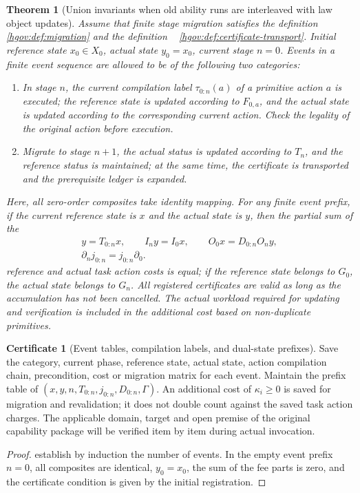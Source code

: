 \documentclass[12pt,a4paper,openany,notitlepage]{report}
\theoremstyle{plain}
\newtheorem{theorem}{Theorem}[chapter]
\theoremstyle{definition}
\newtheorem*{certificate}{Certificate}
\theoremstyle{remark}
\begin{document}
\begin{CJK*}
\begin{theorem}
[Union invariants when old ability runs are interleaved with law object updates]\label{exp:gov:interleaved-governance}
Assume that finite stage migration satisfies the definition ~ \ref{hgov:def:migration} and the definition ~ \ref{hgov:def:certificate-transport}. Initial reference state $x_0\in X_0$, actual state $y_0=x_0$, current stage $n=0$. Events in a finite event sequence are allowed to be of the following two categories:\begin{enumerate}
[label=(\roman*)]\item
In stage $n$, the current compilation label $\tau_{0:n}(a)$ of a primitive action $a$ is executed; the reference state is updated according to $F_{0,a}$, and the actual state is updated according to the corresponding current action. Check the legality of the original action before execution.\item
Migrate to stage $n+1$, the actual status is updated according to $T_n$, and the reference status is maintained; at the same time, the certificate is transported and the prerequisite ledger is expanded.\end{enumerate}
Here, all zero-order composites take identity mapping. For any finite event prefix, if the current reference state is $x$ and the actual state is $y$, then the partial sum of the \[
\begin{gathered}
 y=T_{0:n}x,\qquad I_ny=I_0x,\qquad
 O_0x=D_{0:n}O_ny,\\
 \partial_nj_{0:n}=j_{0:n}\partial_0.
\end{gathered}
\] reference and actual task action costs is equal; if the reference state belongs to $G_0$, the actual state belongs to $G_n$. All registered certificates are valid as long as the accumulation has not been cancelled. The actual workload required for updating and verification is included in the additional cost based on non-duplicate primitives.\end{theorem}
\begin{certificate}
[Event tables, compilation labels, and dual-state prefixes]Save the category, current phase, reference state, actual state, action compilation chain, precondition, cost or migration matrix for each event. Maintain the prefix table of $(x,y,n,T_{0:n},j_{0:n},D_{0:n},\Gamma)$. An additional cost of $\kappa_i\ge0$ is saved for migration and revalidation; it does not double count against the saved task action charges. The applicable domain, target and open premise of the original capability package will be verified item by item during actual invocation.\end{certificate}
\begin{proof}
establish by induction the number of events. In the empty event prefix $n=0$, all composites are identical, $y_0=x_0$, the sum of the fee parts is zero, and the certificate condition is given by the initial registration.


\end{proof}
\end{CJK*}
\end{document}
